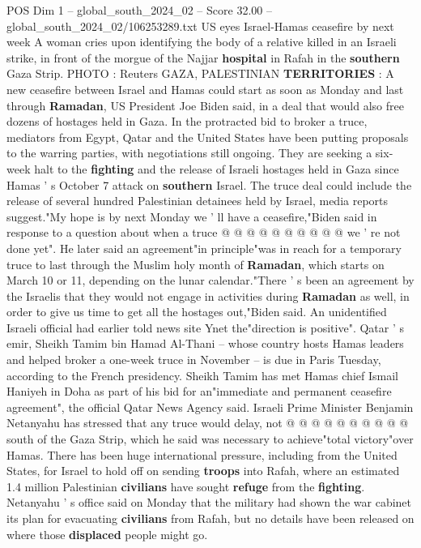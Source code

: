 \begin{textsample}{POS Dim 1 – global\_south\_2024\_02 – Score 32.00 – global\_south\_2024\_02/106253289.txt}  \label{ex:f1_pos_027}
US eyes Israel-Hamas ceasefire by next week A woman cries upon identifying the body of a relative killed in an Israeli strike, in front of the morgue of the Najjar \textbf{hospital} in Rafah in the \textbf{southern} Gaza Strip.
PHOTO : Reuters GAZA, PALESTINIAN \textbf{TERRITORIES} : A new ceasefire between Israel and Hamas could start as soon as Monday and last through \textbf{Ramadan}, US President Joe Biden said, in a deal that would also free dozens of hostages held in Gaza.
In the protracted bid to broker a truce, mediators from Egypt, Qatar and the United States have been putting proposals to the warring parties, with negotiations still ongoing.
They are seeking a six-week halt to the \textbf{fighting} and the release of Israeli hostages held in Gaza since Hamas ' s October 7 attack on \textbf{southern} Israel.
The truce deal could include the release of several hundred Palestinian detainees held by Israel, media reports suggest."My hope is by next Monday we ' ll have a ceasefire,"Biden said in response to a question about when a truce @ @ @ @ @ @ @ @ @ @ we ' re not done yet".
He later said an agreement"in principle"was in reach for a temporary truce to last through the Muslim holy month of \textbf{Ramadan}, which starts on March 10 or 11, depending on the lunar calendar."There ' s been an agreement by the Israelis that they would not engage in activities during \textbf{Ramadan} as well, in order to give us time to get all the hostages out,"Biden said.
An unidentified Israeli official had earlier told news site Ynet the"direction is positive".
Qatar ' s emir, Sheikh Tamim bin Hamad Al-Thani -- whose country hosts Hamas leaders and helped broker a one-week truce in November -- is due in Paris Tuesday, according to the French presidency.
Sheikh Tamim has met Hamas chief Ismail Haniyeh in Doha as part of his bid for an"immediate and permanent ceasefire agreement", the official Qatar News Agency said.
Israeli Prime Minister Benjamin Netanyahu has stressed that any truce would delay, not @ @ @ @ @ @ @ @ @ @ south of the Gaza Strip, which he said was necessary to achieve"total victory"over Hamas.
There has been huge international pressure, including from the United States, for Israel to hold off on sending \textbf{troops} into Rafah, where an estimated 1.4 million Palestinian \textbf{civilians} have sought \textbf{refuge} from the \textbf{fighting}.
Netanyahu ' s office said on Monday that the military had shown the war cabinet its plan for evacuating \textbf{civilians} from Rafah, but no details have been released on where those \textbf{displaced} people might go.

\end{textsample}
